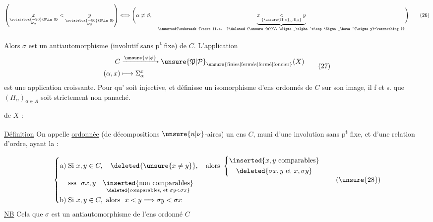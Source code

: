 \begingroup\makeatletter\tagsleft@true\makeatother
\[
\left(
\underset{\substack{\rotatebox{-90}{$\in$}\\\omega_\alpha}}{x}
<
\underset{\substack{\rotatebox{-90}{$\in$}\\\omega_\beta}}{y}
\right)
\Longleftrightarrow
\Biggl(\alpha\ne\beta,\quad
\underbrace{x\underset{\{\unsure{\Pi|\pi}_\alpha,\Pi_\beta\}}{<}y}_{
\inserted{\substack{\text{i.e. }\deleted{\unsure{x}}\\
\Sigma_\alpha^x\cap\Sigma_\beta^{\sigma y}=\varnothing}}}
\Biggr)
\tag*{(26)}
\]

Alors $\sigma$ est un antiautomorphisme (involutif sans p\textsuperscript{t} fixe) de $C$. L'application
\[
\begin{aligned}
C&\xrightarrow{\unsure{\varphi|\phi}}{\unsure{\mathfrak{P}|\mathcal{P}}}_{\unsure{\text{finies}|\text{fermés}|\text{fermé}|\text{foncier}}}(X)\\
(\alpha,x)&\longmapsto\Sigma_\alpha^x
\end{aligned}
\tag*{(27)}
\]
est une application croissante. Pour qu' soit injective, et définisse un isomorphisme d'ens ordonnés de $C$ sur son image, il f et s. que $(\Pi_\alpha)_{\alpha\in A}$ soit strictement non panaché.

 de $X$ :

\uline{Définition} On appelle \uline{  ordonnée} (de décompositions $\unsure{n|\nu}$-aires) un ens   $C$, muni d'une involution \inserted{$\unsure{\sigma}$} sans p\textsuperscript{t} fixe, et d'une relation d'ordre, ayant la   :



  

\[
\left\{
\begin{aligned}
\text{a)}\;&\text{Si }x,y\in C,\quad\deleted{\unsure{x\ne y}},\quad\text{alors }\left\{
\begin{gathered}
\inserted{x,y\text{ comparables}}\\
\deleted{\sigma x,y\text{ et }x,\sigma y}
\end{gathered}\right.\\
&\text{sss }\ \sigma x,y\quad
\underset{\deleted{\text{comparables, et }\sigma y<\sigma x}}{\inserted{\text{non comparables}}}\\
\text{b)}\;&\text{Si }x,y\in C,\ \text{alors }\ x<y\Longrightarrow\sigma y<\sigma x
\end{aligned}\right.
\tag*{(\unsure{28})}
\]
\uline{NB} Cela  que $\sigma$ est un antiautomorphisme de l'ens ordonné $C$

\endgroup
